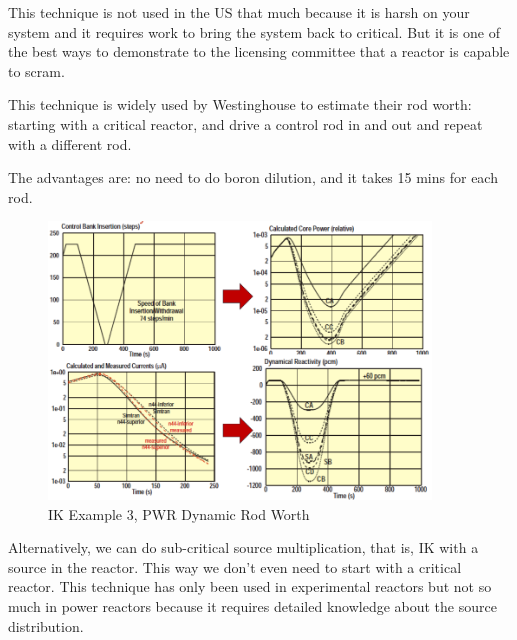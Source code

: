 \documentclass{school-22.211-notes}
\begin{document}
This technique is not used in the US that much because it is harsh on your system and it requires work to bring the system back to critical. But it is one of the best ways to demonstrate to the licensing committee that a reactor is capable to scram.  

This technique is widely used by Westinghouse to estimate their rod worth: starting with a critical reactor, and drive a control rod in and out and repeat with a different rod. 

The advantages are: no need to do boron dilution, and it takes 15 mins for each rod. 
\begin{figure}[ht]
  \centering
  \includegraphics[width=4in]{images/pke/ik-ex3b.png}
  \caption{IK Example 3, PWR Dynamic Rod Worth} \label{ik-ex3}
\end{figure}

Alternatively, we can do sub-critical source multiplication, that is, IK with a source in the reactor. This way we don't even need to start with a critical reactor. This technique has only been used in experimental reactors but not so much in power reactors because it requires detailed knowledge about the source distribution. 
\end{document}
